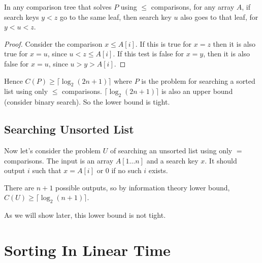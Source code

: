 \begin{lemma}
    In any comparison tree that solves $P$ using $\leq$ comparisons, for any array $A$, if search keys $y<z$ go to the same leaf, then search key $u$ also goes to that leaf, for $y < u < z$.
\end{lemma}

\begin{proof}
    Consider the comparison $x \leq A[i]$. If this is true for $x=z$ then it is also true for $x=u$, since $u < z \leq A[i]$. If this test is false for $x=y$, then it is also false for $x=u$, since $u>y>A[i]$.
\end{proof}

Hence $C(P) \geq \lceil \log_2 (2n+1) \rceil$ where $P$ is the problem for searching a sorted list using only $\leq$ comparisons. $\lceil \log_2 (2n+1) \rceil$ is also an upper bound (consider binary search). So the lower bound is tight.

\subsection{Searching Unsorted List}

Now let's consider the problem $U$ of searching an unsorted list using only $=$ comparisons. The input is an array $A[1\ldots n]$ and a search key $x$. It should output $i$ such that $x=A[i]$ or 0 if no such $i$ exists.

There are $n+1$ possible outputs, so by information theory lower bound, $C(U) \geq \lceil \log_2 (n+1) \rceil$.

As we will show later, this lower bound is not tight.

\section{Sorting In Linear Time}